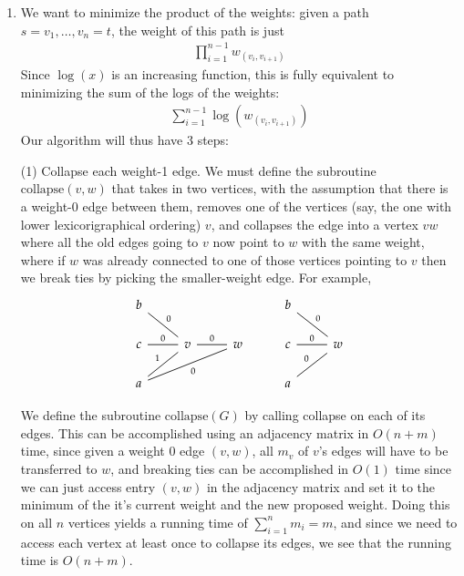 \documentclass[12pt]{article}
\theoremstyle{definitionstyle}
\begin{document}
\begin{enumerate}[leftmargin=\labelsep]
        \newpage
        \item We want to minimize the product of the weights: given a path $s=v_1, \ldots, v_n=t$, the weight of this path is just
        \begin{align*}
            \prod_{i=1}^{n-1} w_{(v_i, v_{i+1})}
        \end{align*}
        Since $\log(x)$ is an increasing function, this is fully equivalent to minimizing the sum of the logs of the weights:
        \begin{align*}
            \sum_{i=1}^{n-1} \log(w_{(v_i, v_{i+1})})
        \end{align*}
        Our algorithm will thus have 3 steps:

        (1) Collapse each weight-1 edge. We must define the subroutine $\text{collapse}(v,w)$ that takes in two vertices, with the assumption that there is a weight-0 edge between them, removes one of the vertices (say, the one with lower lexicorigraphical ordering) $v$, and collapses the edge into a vertex $vw$ where all the old edges going to $v$ now point to $w$ with the same weight, where if $w$ was already connected to one of those vertices pointing to $v$ then we break ties by picking the smaller-weight edge. For example,
        \[\begin{tikzcd}
            b &&& b \\
            c & v & w & c & w \\
            a &&& a
            \arrow["0", no head, from=2-2, to=2-3]
            \arrow["0", no head, from=2-1, to=2-2]
            \arrow["0"', no head, from=2-2, to=1-1]
            \arrow["1"', no head, from=2-2, to=3-1]
            \arrow["0", no head, from=3-4, to=2-5]
            \arrow["0", no head, from=2-4, to=2-5]
            \arrow["0", no head, from=1-4, to=2-5]
            \arrow["0"', no head, from=3-1, to=2-3]
        \end{tikzcd}\]

        We define the subroutine $\text{collapse}(G)$ by calling collapse on each of its edges. This can be accomplished using an adjacency matrix in $O(n+m)$ time, since given a weight 0 edge $(v,w)$, all $m_v$ of $v$'s edges will have to be transferred to $w$, and breaking ties can be accomplished in $O(1)$ time since we can just access entry $(v,w)$ in the adjacency matrix and set it to the minimum of the it's current weight and the new proposed weight. Doing this on all $n$ vertices yields a running time of $\sum_{i=1}^n m_i = m$, and since we need to access each vertex at least once to collapse its edges, we see that the running time is $O(n+m)$. 
        

\end{enumerate}
\end{document}
